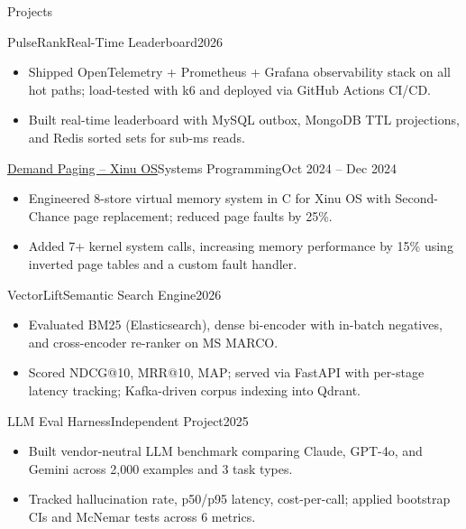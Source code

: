 \documentclass[]{mcdowellcv}
\begin{document}
\begin{cvsection}{Projects}
  \begin{cvsubsection}{PulseRank}{Real-Time Leaderboard}{2026}
    \begin{itemize}
      \item Shipped OpenTelemetry + Prometheus + Grafana observability stack on all hot paths; load-tested with k6 and deployed via GitHub Actions CI/CD.
      \item Built real-time leaderboard with MySQL outbox, MongoDB TTL projections, and Redis sorted sets for sub-ms reads.
    \end{itemize}
    \vspace{-1.5pt}
  \end{cvsubsection}

  \begin{cvsubsection}{\href{https://github.com/ncsu-csc-501/project3-mndedhia_akulka26_aapai}{Demand Paging -- Xinu OS}}{Systems Programming}{Oct 2024 -- Dec 2024}
    \begin{itemize}
      \item Engineered 8-store virtual memory system in C for Xinu OS with Second-Chance page replacement; reduced page faults by 25\%.
      \item Added 7+ kernel system calls, increasing memory performance by 15\% using inverted page tables and a custom fault handler.
    \end{itemize}
    \vspace{-1.5pt}
  \end{cvsubsection}

  \begin{cvsubsection}{VectorLift}{Semantic Search Engine}{2026}
    \begin{itemize}
      \item Evaluated BM25 (Elasticsearch), dense bi-encoder with in-batch negatives, and cross-encoder re-ranker on MS MARCO.
      \item Scored NDCG@10, MRR@10, MAP; served via FastAPI with per-stage latency tracking; Kafka-driven corpus indexing into Qdrant.
    \end{itemize}
    \vspace{-1.5pt}
  \end{cvsubsection}

  \begin{cvsubsection}{LLM Eval Harness}{Independent Project}{2025}
    \begin{itemize}
      \item Built vendor-neutral LLM benchmark comparing Claude, GPT-4o, and Gemini across 2,000 examples and 3 task types.
      \item Tracked hallucination rate, p50/p95 latency, cost-per-call; applied bootstrap CIs and McNemar tests across 6 metrics.
    \end{itemize}
  \end{cvsubsection}
\end{cvsection}
\end{document}
